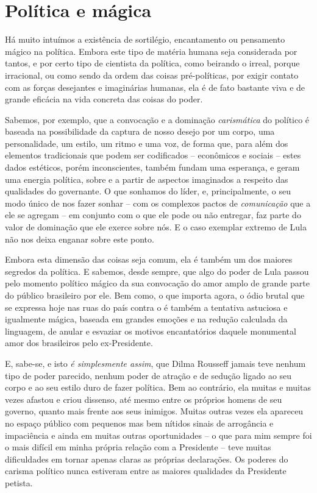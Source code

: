   \section{Política e mágica}\label{poluxedtica-e-muxe1gica}

Há muito intuímos a existência de sortilégio, encantamento ou pensamento
mágico na política. Embora este tipo de matéria humana seja considerada
por tantos, e por certo tipo de cientista da política, como beirando o
irreal, porque irracional, ou como sendo da ordem das coisas
pré-políticas, por exigir contato com as forças desejantes e imaginárias
humanas, ela é de fato bastante viva e de grande eficácia na vida
concreta das coisas do poder.

Sabemos, por exemplo, que a convocação e a dominação \emph{carismática}
do político é baseada na possibilidade da captura de nosso desejo por um
corpo, uma personalidade, um estilo, um ritmo e uma voz, de forma que,
para além dos elementos tradicionais que podem ser codificados --
econômicos e sociais -- estes dados estéticos, porém inconscientes,
também fundam uma esperança, e geram uma energia política, sobre e a
partir de aspectos imaginados a respeito das qualidades do governante. O
que sonhamos do líder, e, principalmente, o seu modo único de nos fazer
sonhar -- com os complexos pactos de \emph{comunicação} que a ele se
agregam -- em conjunto com o que ele pode ou não entregar, faz parte do
valor de dominação que ele exerce sobre nós. E o caso exemplar extremo
de Lula não nos deixa enganar sobre este ponto.

Embora esta dimensão das coisas seja comum, ela é também um dos maiores
segredos da política. E sabemos, desde sempre, que algo do poder de Lula
passou pelo momento político mágico da sua convocação do amor amplo de
grande parte do público brasileiro por ele. Bem como, o que importa
agora, o ódio brutal que se expressa hoje nas ruas do país contra o  é
também a tentativa astuciosa e igualmente mágica, baseada em grandes
emoções e na redução calculada da linguagem, de anular e esvaziar os
motivos encantatórios daquele monumental amor dos brasileiros pelo
ex-Presidente.

E, sabe-se, e isto \emph{é simplesmente assim}, que Dilma Rousseff
jamais teve nenhum tipo de poder parecido, nenhum poder de atração e de
sedução ligado ao seu corpo e ao seu estilo duro de fazer política. Bem
ao contrário, ela muitas e muitas vezes afastou e criou dissenso, até
mesmo entre os próprios homens de seu governo, quanto mais frente aos
seus inimigos. Muitas outras vezes ela apareceu no espaço público com
pequenos mas bem nítidos sinais de arrogância e impaciência e ainda em
muitas outras oportunidades -- o que para mim sempre foi o mais difícil
em minha própria relação com a Presidente -- teve muitas dificuldades em
tornar apenas claras as próprias declarações. Os poderes do carisma
político nunca estiveram entre as maiores qualidades da Presidente
petista.

